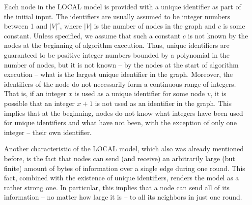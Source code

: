 Each node in the LOCAL model is provided with a unique identifier as part of the initial input.
The identifiers are usually assumed to be integer numbers between 1 and $|V|^c$, where
$|V|$ is the number of nodes in the graph and $c$ is some constant. Unless specified, we
assume that such a constant $c$ is not known by the nodes at the beginning of
algorithm execution. Thus, unique identifiers are guaranteed to be positive integer
numbers bounded by a polynomial in the number of nodes, but it is not known -- by the nodes
at the start of algorithm execution -- what is the largest unique identifier in the graph. Moreover,
the identifiers of the node do not necessarily form a continuous range of integers. That is,
if an integer $x$ is used as a unique identifier for some node $v$, it is possible
that an integer $x+1$ is not used as an identifier in the graph. This implies that at
the beginning, nodes do not know what integers have been used for unique identifiers
and what have not been, with the exception of only one integer -- their own identifier.

Another characteristic of the LOCAL model, which also was already mentioned before, is the fact
that nodes can send (and receive) an arbitrarily large (but finite)
amount of bytes of information over a single edge during one round. This fact,
combined with the existence of unique identifiers, renders the model as a rather strong one.
In particular, this implies that a node can send all of its information -- no matter how
large it is -- to all its neighbors in just one round.

